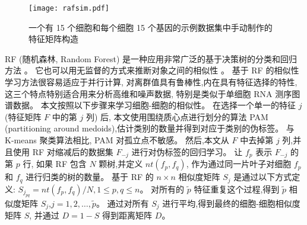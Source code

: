 \begin{figure}[!htbp]
    \centering
    \texttt{[image: rafsim.pdf]}
    \caption{一个有 15 个细胞和每个细胞 15 个基因的示例数据集中手动制作的特征矩阵构造
    }
    \label{fig:rafsim}
\end{figure}

RF (随机森林, Random Forest) 是一种应用非常广泛的基于决策树的分类和回归方法 。
它也可以用无监督的方式来推断对象之间的相似性 。
基于 RF 的相似性学习方法很容易适应于并行计算,
对离群值具有鲁棒性,内在具有特征选择的特性,这三个特点特别适合用来分析高维和噪声数据,
特别是类似于单细胞 RNA 测序图谱数据。
本文按照以下步骤来学习细胞-细胞的相似性。
在选择一个单一的特征 $j$ (特征矩阵 $F$ 中的第 $j$ 列) 后, 
本文使用围绕质心点进行划分的算法 PAM (partitioning around medoids),估计类别的数量并得到对应于类别的伪标签。
与 K-means 聚类算法相比, PAM 对孤立点不敏感。
然后,本文从 $F$ 中去掉第 $j$ 列,并且使用 RF 对缩减后的数据集 $F_{-j}$ 进行对伪标签的回归学习。
让 $f_p$ 表示 $F_{-j}$ 的第 $p$ 行,
如果 RF 包含 $N$ 颗树,并定义 $nt(f_p,f_q)$, 作为通过同一片叶子对细胞 $f_p$ 和 $f_q$ 进行归类的树的数量。
基于 RF 的 $n \times n$ 相似度矩阵 $S_j$ 是通过以下方式定义:
$S_{j_{pq}} = nt(f_p,f_q) / N, 1 \le p,q \le n$。
对所有的 $\tilde{p}$ 特征重复这个过程,得到 $\tilde{p}$ 相似度矩阵 $S_j$,$j=1,2,\ldots,\tilde{p}$。
通过对所有 $S_j$ 进行平均,得到最终的细胞-细胞相似度矩阵 $S$,
并通过 $D=1-S$ 得到距离矩阵 $D$。

